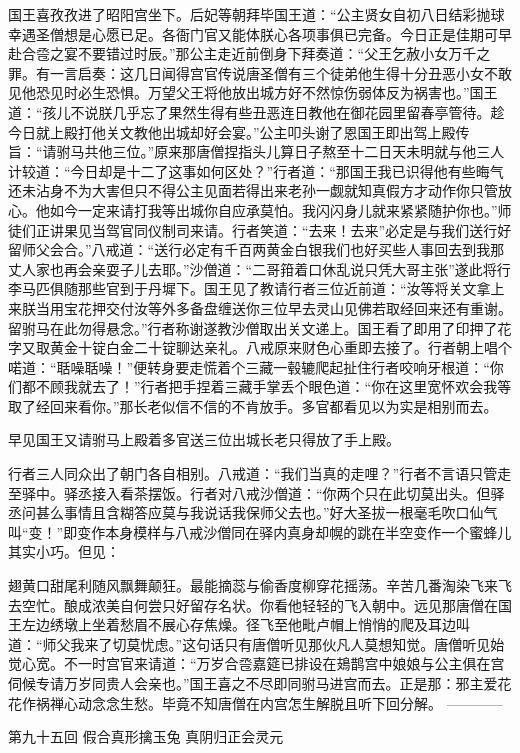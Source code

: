 \documentclass[12pt,UTF8]{ctexbook}
\begin{document}
{	国王喜孜孜进了昭阳宫坐下。后妃等朝拜毕国王道：“公主贤女自初八日结彩抛球幸遇圣僧想是心愿已足。各衙门官又能体朕心各项事俱已完备。今日正是佳期可早赴合卺之宴不要错过时辰。”那公主走近前倒身下拜奏道：“父王乞赦小女万千之罪。有一言启奏：这几日闻得宫官传说唐圣僧有三个徒弟他生得十分丑恶小女不敢见他恐见时必生恐惧。万望父王将他放出城方好不然惊伤弱体反为祸害也。”国王道：“孩儿不说朕几乎忘了果然生得有些丑恶连日教他在御花园里留春亭管待。趁今日就上殿打他关文教他出城却好会宴。”公主叩头谢了恩国王即出驾上殿传旨：“请驸马共他三位。”原来那唐僧捏指头儿算日子熬至十二日天未明就与他三人计较道：“今日却是十二了这事如何区处？”行者道：“那国王我已识得他有些晦气还未沾身不为大害但只不得公主见面若得出来老孙一觑就知真假方才动作你只管放心。他如今一定来请打我等出城你自应承莫怕。我闪闪身儿就来紧紧随护你也。”师徒们正讲果见当驾官同仪制司来请。行者笑道：“去来！去来”必定是与我们送行好留师父会合。”八戒道：“送行必定有千百两黄金白银我们也好买些人事回去到我那丈人家也再会亲耍子儿去耶。”沙僧道：“二哥箝着口休乱说只凭大哥主张”遂此将行李马匹俱随那些官到于丹墀下。国王见了教请行者三位近前道：“汝等将关文拿上来朕当用宝花押交付汝等外多备盘缠送你三位早去灵山见佛若取经回来还有重谢。留驸马在此勿得悬念。”行者称谢遂教沙僧取出关文递上。国王看了即用了印押了花字又取黄金十锭白金二十锭聊达亲礼。八戒原来财色心重即去接了。行者朝上唱个喏道：“聒噪聒噪！”便转身要走慌着个三藏一毂辘爬起扯住行者咬响牙根道：“你们都不顾我就去了！”行者把手捏着三藏手掌丢个眼色道：“你在这里宽怀欢会我等取了经回来看你。”那长老似信不信的不肯放手。多官都看见以为实是相别而去。
	
	早见国王又请驸马上殿着多官送三位出城长老只得放了手上殿。
	
	行者三人同众出了朝门各自相别。八戒道：“我们当真的走哩？”行者不言语只管走至驿中。驿丞接入看茶摆饭。行者对八戒沙僧道：“你两个只在此切莫出头。但驿丞问甚么事情且含糊答应莫与我说话我保师父去也。”好大圣拔一根毫毛吹口仙气叫“变！”即变作本身模样与八戒沙僧同在驿内真身却幌的跳在半空变作一个蜜蜂儿其实小巧。但见：
	
	翅黄口甜尾利随风飘舞颠狂。最能摘蕊与偷香度柳穿花摇荡。辛苦几番淘染飞来飞去空忙。酿成浓美自何尝只好留存名状。你看他轻轻的飞入朝中。远见那唐僧在国王左边绣墩上坐着愁眉不展心存焦燥。径飞至他毗卢帽上悄悄的爬及耳边叫道：“师父我来了切莫忧虑。”这句话只有唐僧听见那伙凡人莫想知觉。唐僧听见始觉心宽。不一时宫官来请道：“万岁合卺嘉筵已排设在鳷鹊宫中娘娘与公主俱在宫伺候专请万岁同贵人会亲也。”国王喜之不尽即同驸马进宫而去。正是那：邪主爱花花作祸禅心动念念生愁。毕竟不知唐僧在内宫怎生解脱且听下回分解。
	------------
	
	第九十五回 假合真形擒玉兔 真阴归正会灵元
	
}
\end{document}
